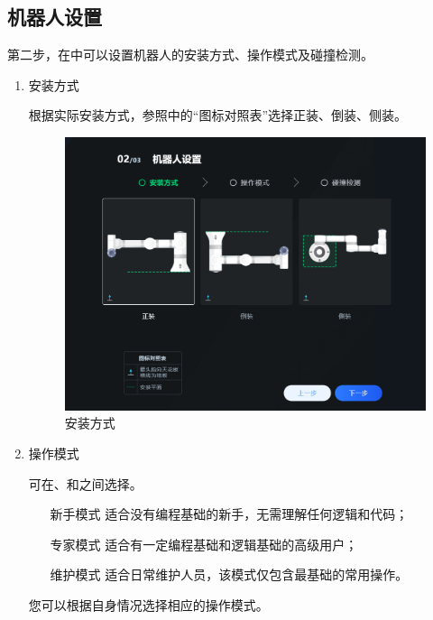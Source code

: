 \subsection{机器人设置}
第二步，在中可以设置机器人的安装方式、操作模式及碰撞检测。
\begin{enumerate}
\item 安装方式

	根据实际安装方式，参照中的“图标对照表”选择正装、倒装、侧装。

	\begin{figure}[ht]
		\centering
		\includegraphics[width=\textwidth]{screen/2-6.png}
		\caption{安装方式}
		\label{fig:安装方式}
	\end{figure}



\item 操作模式

可在、和之间选择。 
\begin{itemize}
\item[新手模式] 适合没有编程基础的新手，无需理解任何逻辑和代码；
\item[专家模式] 适合有一定编程基础和逻辑基础的高级用户；
\item[维护模式] 适合日常维护人员，该模式仅包含最基础的常用操作。
\end{itemize}
您可以根据自身情况选择相应的操作模式。 


\end{enumerate}
